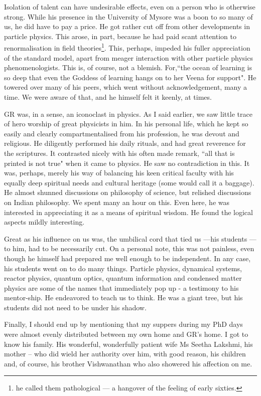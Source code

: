 Isolation of talent can have undesirable effects, even on a person who is otherwise strong. While his presence in the University of Mysore was a boon to so many of us, he did have to pay a price. He got rather cut off from other developments in particle physics. This arose, in part, because he had paid scant attention to renormalisation in field theories\footnote{he called them pathological --- a hangover of the feeling of early sixties.}. This, perhaps, impeded his fuller appreciation of the standard model, apart from meager interaction with other particle physics phenomenologists. This is, of course, not a blemish. For,``the ocean of learning is so deep that even the Goddess of learning hangs on to her Veena for support". He towered over many of his peers, which went without acknowledgement, many a time. We were aware of that, and he himself felt it keenly, at times.

GR was, in a sense, an iconoclast in physics. As I said earlier, we saw little trace of hero worship of great physicists in him. In his personal life, which he kept so easily and clearly compartmentalised from his profession, he was devout and religious. He diligently performed his daily rituals, and had great reverence for the scriptures. It contrasted nicely with his often made remark, ``all that is printed is not true" when it came to physics. He saw no contradiction in this. It was, perhaps, merely his way of balancing his keen critical faculty with his equally deep spiritual needs and cultural heritage (some would call it a baggage).  He almost shunned discussions on philosophy of science, but relished discussions on Indian philosophy. We spent many an hour on this. Even here, he was interested in appreciating it as a means of spiritual wisdom. He found the logical aspects mildly interesting.

Great as his influence on us was, the umbilical cord that tied us ---his students ---to him, had to be necessarily cut. On a personal note, this was not painless, even though he himself had prepared me well enough to be independent. In any case, his students went on to do many things. Particle physics, dynamical systems, reactor physics, quantum optics, quantum information and condensed matter physics are some of the names that immediately pop up - a testimony to his mentor-ship. He endeavored to teach us to think. He was a giant tree, but his students did not need to be under his shadow.

Finally, I should end up by mentioning that my suppers during my PhD days were almost evenly distributed between my own home and GR's home. I got to know his family. His wonderful, wonderfully patient wife Ms Seetha Lakshmi, his mother -- who did wield her authority over him, with good reason, his children and, of course, his brother Vishwanathan who also showered his affection on me.

